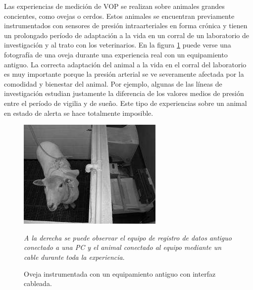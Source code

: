 Las experiencias de medición de VOP se realizan sobre animales grandes concientes, como ovejas o cerdos. Estos animales se encuentran previamente instrumentados con sensores de presión intraarteriales en forma crónica y tienen un prolongado período de adaptación a la vida en un corral de un laboratorio de investigación y al trato con los veterinarios. En la figura \ref{fig:oveja} puede verse una fotografía de una oveja durante una experiencia real con un equipamiento antiguo. La correcta adaptación del animal a la vida en el corral del laboratorio es muy importante porque la presión arterial se ve severamente afectada por la comodidad y bienestar del animal. Por ejemplo, algunas de las líneas de investigación estudian justamente la diferencia de los valores medios de presión entre el período de vigilia y de sueño. Este tipo de experiencias sobre un animal en estado de alerta se hace totalmente imposible.


\begin{figure}[!htbp]
	\centering
	
	\begin{minipage}{0.65\textwidth}
		\includegraphics[width=\textwidth]{./Figures/oveja.png}
		{\footnotesize \textit{A la derecha se puede observar el equipo de registro de datos antiguo conectado a una PC y el animal conectado al equipo mediante un cable durante toda la experiencia}.\par}		
	\end{minipage}		
	
	\caption{Oveja instrumentada con un equipamiento antiguo con interfaz cableada.}
	\label{fig:oveja}
\end{figure}

